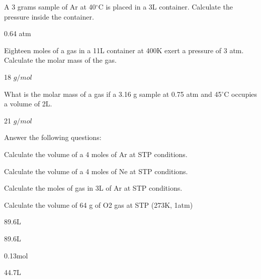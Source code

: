 \documentclass[main.tex]{subfiles}
\begin{document}
\begin{multicols*}{2}
\begin{question}[ID=\the\value{numA}]
A 3 grams sample of Ar at 40$^\circ$C is placed in a 3L container. Calculate the pressure inside the container.
\end{question}
\begin{solution}
0.64 atm
\hspace{0.1cm}\end{solution}%
\begin{question}[ID=\the\value{numA}]
Eighteen moles of a gas in a 11L container at 400K exert a pressure of 3 atm. Calculate the molar mass of the gas.
\end{question}
\begin{solution}
18 $g/mol$
\hspace{0.1cm}\end{solution}%
\begin{question}[ID=\the\value{numA}]
What is the molar mass of a gas if a 3.16 g sample at 0.75 atm and 45$^{\circ}$C occupies a volume of 2L.
\end{question}
\begin{solution}
21 $g/mol$
\hspace{0.1cm}\end{solution}%





\begin{question}[ID=\the\value{numA}]
Answer the following questions:
\begin{inparaenum}[(a)]	
\item  Calculate the volume of a 4 moles of Ar at STP conditions.
\item   Calculate the volume of a 4 moles of Ne at STP conditions.
\item Calculate the moles of gas in 3L  of Ar at STP conditions.
\item Calculate the volume of 64 g of O2 gas at STP (273K, 1atm)
\end{inparaenum} 
\end{question}
\begin{solution}
\begin{inparaenum}[(a)]	
\item  89.6L
\item  89.6L
\item 0.13mol
\item 44.7L
\end{inparaenum} 
\hspace{0.1cm}\end{solution}%




\end{multicols*}
\end{document}
